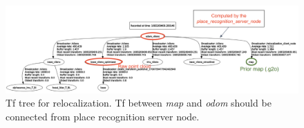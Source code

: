 \begin{figure}[t]
  \centering
  \includegraphics[width=0.99\columnwidth]{pics/impelementation_relocalization_tf.png}
  \caption{Tf tree for relocalization. Tf between \emph{map} and \emph{odom} should be connected from place recognition server node.}
  \label{fig:implementation_relocalization_tf}
\end{figure}